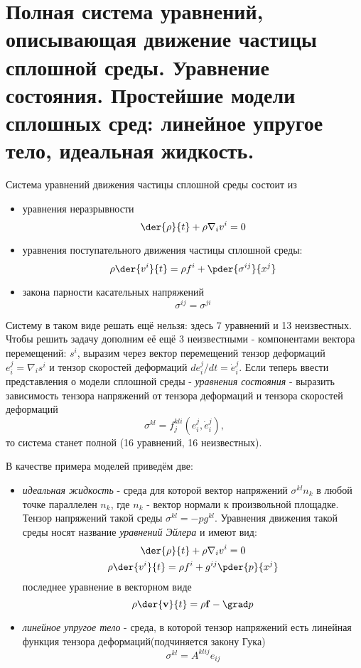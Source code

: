 \chapter{Полная система уравнений, описывающая движение частицы сплошной
среды. Уравнение состояния. Простейшие модели сплошных сред: линейное
упругое тело, идеальная жидкость.}

Система уравнений движения частицы сплошной среды состоит из
\begin{itemize}
\item уравнения неразрывности
\[
    \der{\rho }{t}+ \rho {\nabla_iv^i } = 0 
\]
\item уравнения поступательного движения частицы сплошной среды:
\[
    \rho  \der{v^i}{t}  = \rho f^i + \pder{ \sigma^{ij}}{x^j}      
\]
\item закона парности касательных напряжений
\[
    \sigma^{ij} = \sigma^{ji}
\]
\end{itemize}

Систему в таком виде решать ещё нельзя: здесь 7 уравнений и 13 неизвестных.
Чтобы решить задачу дополним её ещё 3 неизвестными - компонентами вектора
перемещений: \( s^{i} \), выразим через вектор перемещений тензор деформаций
\( e^j_i  = \nabla_i s^i \) и тензор скоростей деформаций
\( {de^j_i}/{dt} = \dot{e}^j_i \). Если теперь ввести представления о модели
сплошной среды - \emph{уравнения состояния} - выразить зависимость тензора
напряжений от тензора деформаций и тензора скоростей деформаций
\[
    \sigma^{kl} = f^{kli}_j(e^j_i, \dot{e}^j_i),
\]
то система станет полной (16 уравнений, 16 неизвестных).

В качестве примера моделей приведём две:
\begin{itemize}
\item \emph{идеальная жидкость} - среда для которой вектор напряжений
\( \sigma^{kl}n_k \) в любой точке параллелен \( n_k \), где \( n_k \) - вектор
нормали к произвольной площадке. Тензор напряжений такой среды 
\( \sigma^{kl} = - p g^{kl} \). Уравнения движения такой среды носят название
\emph{уравнений Эйлера} и имеют вид:
\begin{gather*}
    \der{\rho }{t}+ \rho {\nabla_iv^i } = 0 \\
    \rho  \der{v^i}{t}  = \rho f^i + g^{ij}\pder{ p}{x^j}      
\end{gather*}
последнее уравнение в векторном виде
\[
    \rho \der{\vec{v}}{t} = \rho \vec{f} - \grad p
\]

\item \emph{линейное упругое тело} - среда, в которой тензор напряжений есть линейная функция тензора деформаций(подчиняется закону Гука)
\[
    \sigma^{kl} = A^{klij}e_{ij}
\]
\end{itemize}

\newpage
